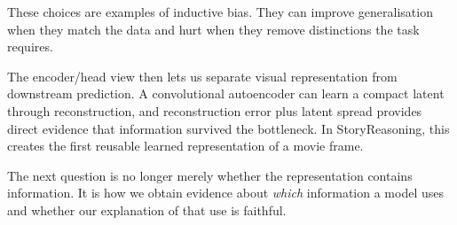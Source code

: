 These choices are examples of inductive bias. They can improve generalisation when they match the data and hurt when they remove distinctions the task requires.

The encoder/head view then lets us separate visual representation from downstream prediction. A convolutional autoencoder can learn a compact latent through reconstruction, and reconstruction error plus latent spread provides direct evidence that information survived the bottleneck. In StoryReasoning, this creates the first reusable learned representation of a movie frame.

The next question is no longer merely whether the representation contains information. It is how we obtain evidence about \emph{which} information a model uses and whether our explanation of that use is faithful.
